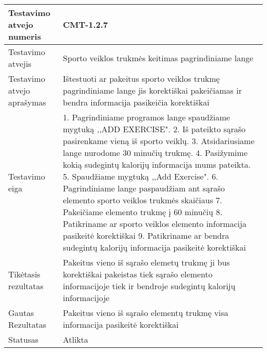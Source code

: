 \documentclass[oneside]{VUMIFPSkursinis}
\begin{document}
\begin{center}
    \begin{tabular}{ |p{5cm}|p{13cm}|}
    \hline
        Testavimo atvejo numeris & CMT-1.2.7  \\ \hline
        Testavimo atvejis & Sporto veiklos trukmės keitimas pagrindiniame lange \\ \hline
        Testavimo atvejo aprašymas & Ištestuoti ar pakeitus sporto veiklos trukmę pagrindiniame lange jis korektiškai pakeičiamas ir bendra informacija pasikeičia korektiškai \\ \hline
        Testavimo eiga &  1. Pagrindiniame programos lange spaudžiame mygtuką ,,ADD EXERCISE". 
				2. Iš pateikto sąrašo pasirenkame vieną iš sporto veiklų. 
				3. Atsidariusiame lange nurodome 30 minučių trukmę.
				4. Pasižymime kokią sudegintų kalorijų informacija mums pateikta. 
				5. Spaudžiame mygtuką ,,Add Exercise".
				6. Pagrindiniame lange paspaudžiam ant sąrašo elemento sporto veiklos trukmės skaičiaus
				7. Pakeičiame elemento trukmę į 60 minučių
				8. Patikriname ar sporto veiklos elemento informacija pasikeitė korektiškai
				9. Patikriname ar bendra sudegintų kalorijų informacija pasikeitė korektiškai\\ \hline
        Tikėtasis rezultatas &  Pakeitus vieno iš sąrašo elemetų trukmę ji bus korektiškai pakeistas tiek sąrašo elemento informacijoje tiek ir bendroje sudegintų kalorijų informacijoje \\ \hline
        Gautas Rezultatas & Pakeitus vieno iš sąrašo elementų trukmę visa informacija pasikeitė korektiškai \\ \hline
        Statusas &  Atlikta\\ \hline
    \hline
    \end{tabular}
\end{center}

\iffalse XXXXXXXXXXXXXXXXXXXXXXXXXXXXXXXXXXXXXXXXXXXXXXXXXXXXXXXXXXXXXXXXXXXXXXXXXXXXXXXXXXXXXXXXXXXXXXXXXXXXXXXXXXXXXXXXXXXXXXXXXXXXXXXXXXXXXXX \fi
\end{document}
